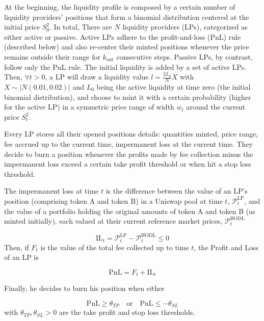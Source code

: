 \documentclass[a4paper,11pt]{article}
\begin{document}
At the beginning, the liquidity profile is composed by a certain number of liquidity providers' positions that form a binomial distribution centered at the initial price $S^2_0$. In total, There are $N$ liquidity providers (LPs), categorized as either active or passive. Active LPs adhere to the profit-and-loss (PnL) rule (described below) and also re-center their minted positions whenever the price remains outside their range for $k_{\text{out}}$ consecutive steps. Passive LPs, by contrast, follow only the PnL rule. The initial liquidity is added by a set of active LPs. Then, $\forall t > 0$, a LP will draw a liquidity value $l=\frac{2L_0}{N}X$ with $X\sim|N(0.01,0.02)|$ and $L_0$ being the active liquidity at time zero (the initial binomial distribution), and choose to mint it with a certain probability (higher for the active LP) in a symmetric price range of width $w_t$ around the current  price $S^2_t$.

Every LP stores all their opened positions details: quantities minted, price range, fee accrued up to the current time, impermanent loss at the current time. They decide to burn a position whenever the profits made by fee collection minus the impermanent loss exceed a certain take profit threshold or when hit a stop loss threshold.

The impermanent loss at time $t$ is the difference between the value of an LP's position (comprising token A and token B) in a Uniswap pool at time $t$, $ \mathcal{P}^{\text{LP}}_t$, and the value of a portfolio holding the original amounts of token A and token B (as minted initially), each valued at their current reference market prices, $\mathcal{P}^{\text{HODL}}_t$ 

\begin{equation}
    \text{IL}_t = \mathcal{P}^{\text{LP}}_t - \mathcal{P}^{\text{HODL}}_t \leq 0
\end{equation}
Then, if $F_t$ is the value of the total fee collected up to time $t$, the Profit and Loss of an LP is

\begin{equation}
    \text{PnL} = F_t + \text{IL}_t
\end{equation}

Finally, he decides to burn his position when either

\begin{equation}
    \text{PnL} \geq \theta_{TP} \quad \text{or} \quad \text{PnL} \leq -\theta_{SL}
\end{equation}
 with $\theta_{TP}, \theta_{SL} >0$ are the take profit and stop loss thresholds.
\end{document}
